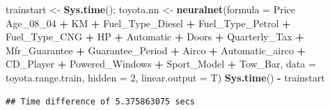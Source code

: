 \documentclass[]{article}
\newenvironment{Shaded}{\begin{snugshade}}{\end{snugshade}}
\newcommand{\KeywordTok}[1]{\textcolor[rgb]{0.13,0.29,0.53}{\textbf{#1}}}
\newcommand{\DataTypeTok}[1]{\textcolor[rgb]{0.13,0.29,0.53}{#1}}
\newcommand{\DecValTok}[1]{\textcolor[rgb]{0.00,0.00,0.81}{#1}}
\newcommand{\StringTok}[1]{\textcolor[rgb]{0.31,0.60,0.02}{#1}}
\newcommand{\CommentTok}[1]{\textcolor[rgb]{0.56,0.35,0.01}{\textit{#1}}}
\newcommand{\OperatorTok}[1]{\textcolor[rgb]{0.81,0.36,0.00}{\textbf{#1}}}
\newcommand{\NormalTok}[1]{#1}
\begin{document}
\begin{Shaded}
\begin{Highlighting}[]
\NormalTok{trainstart <-}\StringTok{ }\KeywordTok{Sys.time}\NormalTok{();}
\NormalTok{toyota.nn <-}\StringTok{ }\KeywordTok{neuralnet}\NormalTok{(}\DataTypeTok{formula =}\NormalTok{ Price }\OperatorTok{~}\StringTok{ }\NormalTok{Age_08_}\DecValTok{04} \OperatorTok{+}\StringTok{ }\NormalTok{KM }\OperatorTok{+}\StringTok{ }\NormalTok{Fuel_Type_Diesel }\OperatorTok{+}\StringTok{ }\NormalTok{Fuel_Type_Petrol }\OperatorTok{+}\StringTok{ }\NormalTok{Fuel_Type_CNG }\OperatorTok{+}\StringTok{ }\NormalTok{HP }\OperatorTok{+}\StringTok{ }\NormalTok{Automatic }\OperatorTok{+}\StringTok{ }\NormalTok{Doors }\OperatorTok{+}\StringTok{ }\NormalTok{Quarterly_Tax }\OperatorTok{+}\StringTok{ }\NormalTok{Mfr_Guarantee }\OperatorTok{+}\StringTok{ }\NormalTok{Guarantee_Period }\OperatorTok{+}\StringTok{ }\NormalTok{Airco }\OperatorTok{+}\StringTok{ }\NormalTok{Automatic_airco }\OperatorTok{+}\StringTok{ }\NormalTok{CD_Player }\OperatorTok{+}\StringTok{ }\NormalTok{Powered_Windows }\OperatorTok{+}\StringTok{ }\NormalTok{Sport_Model }\OperatorTok{+}\StringTok{ }\NormalTok{Tow_Bar, }\DataTypeTok{data =}\NormalTok{ toyota.range.train, }\DataTypeTok{hidden =} \DecValTok{2}\NormalTok{, }\DataTypeTok{linear.output =}\NormalTok{ T)}
\KeywordTok{Sys.time}\NormalTok{() }\OperatorTok{-}\StringTok{ }\NormalTok{trainstart}
\end{Highlighting}
\end{Shaded}

\begin{verbatim}
## Time difference of 5.375863075 secs
\end{verbatim}

\begin{Shaded}
\end{Shaded}
\end{document}
